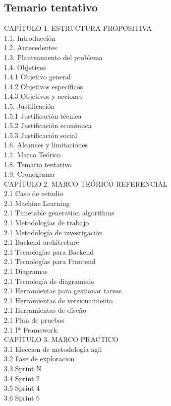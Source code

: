 \subsection{Temario tentativo}

CAPÍTULO 1. ESTRUCTURA PROPOSITIVA \\
1.1. Introducción \\
1.2. Antecedentes \\
1.3. Planteamiento del problema \\
1.4. Objetivos \\
1.4.1 Objetivo general\\
1.4.2 Objetivos específicos \\
1.4.3 Objetivos y acciones \\
1.5. Justificación \\
1.5.1 Justificación técnica \\
1.5.2 Justificación económica \\
1.5.3 Justificación social \\
1.6. Alcances y limitaciones \\
1.7. Marco Teórico \\
1.8. Temario tentativo \\
1.9. Cronograma \\

CAPÍTULO 2. MARCO TEÓRICO REFERENCIAL \\
2.1 Caso de estudio\\
2.1 Machine Learning\\
2.1 Timetable generation algorithms\\
2.1 Metodologías de trabajo\\
2.1 Metodología de investigación\\
2.1 Backend architecture\\
2.1 Tecnologías para Backend\\
2.1 Tecnologías para Frontend\\
2.1 Diagramas\\
2.1 Tecnología de diagramado\\
2.1 Herramientas para gestionar tareas\\
2.1 Herramientas de versionamiento\\
2.1 Herramientas de diseño\\
2.1 Plan de pruebas\\
2.1 I* Framework\\

CAPÍTULO 3. MARCO PRACTICO \\

3.1 Eleccion de metodología agil \\
3.2 Fase de exploracion \\
3.3 Sprint N \\
3.4 Sprint 2 \\
3.5 Sprint 4 \\
3.6 Sprint 6 \\

